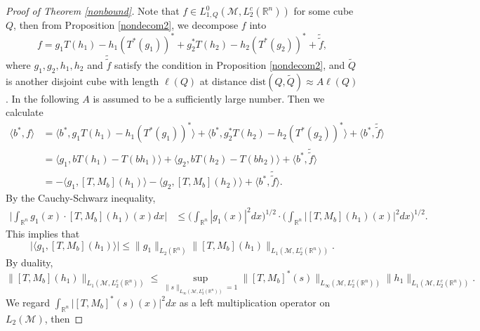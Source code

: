 \documentclass[oneside,english,a4wide]{amsart}
\numberwithin{equation}{section}
\numberwithin{figure}{section}
\theoremstyle{plain}
\theoremstyle{plain}
\theoremstyle{definition}
\theoremstyle{plain}
\theoremstyle{remark}
\theoremstyle{definition}
\theoremstyle{remark}
\theoremstyle{definition}
\newcommand{\8}{\infty}
\begin{document}
\begin{proof}[Proof of Theorem \ref{nonbound}]
	Note that $f\in L^0_{1,Q}(\mathcal{M},L_2^c(\mathbb{R}^n))$ for some cube $Q$, then from Proposition \ref{nondecom2}, we decompose $f$ into
	\begin{equation*}
		f=g_1T(h_1)-h_1(T^*(g_1))^*+ g_2^*T(h_2)-h_2(T^*(g_2))^*+\tilde{\tilde{f}},
	\end{equation*}
	where $g_1,g_2,h_1,h_2$ and $\tilde{\tilde{f}}$ satisfy the condition in Proposition \ref{nondecom2}, and $\tilde{Q}$ is another disjoint cube with length $\ell(Q)$ at distance $\mathrm{dist}(Q,\tilde{Q})\approx A\ell(Q)$. In the following $A$ is assumed to be a sufficiently large number. Then we calculate
	\begin{equation}\label{bf000}
		\begin{aligned}
			\langle b^*,f\rangle{}&=\big\langle b^*,g_1T(h_1)-h_1(T^*(g_1))^*\big\rangle+\big\langle b^*, g_2^*T(h_2)-h_2(T^*(g_2))^*\big\rangle+\langle b^*,\tilde{\tilde{f}}\rangle\\
			&=\big\langle g_1,bT(h_1)-T(bh_1)\big\rangle+\big\langle g_2,bT(h_2)-T(bh_2)\big\rangle+\langle b^*,\tilde{\tilde{f}}\rangle\\
			&=-\big\langle g_1,[T,M_b](h_1)\big\rangle-\big\langle g_2,[T,M_b](h_2)\big\rangle+\langle b^*,\tilde{\tilde{f}}\rangle.
		\end{aligned}
	\end{equation} 
	By the Cauchy-Schwarz inequality,
	\begin{equation*}
		\begin{aligned}
			\bigg|\int_{\mathbb{R}^n}  g_1(x)\cdot [T,M_b](h_1)(x)dx\bigg|{}&\le \bigg(\int_{\mathbb{R}^n}|g_1(x)|^2dx\bigg)^{1/2}\cdot \bigg(\int_{\mathbb{R}^n}\big|[T,M_b](h_1)(x)\big|^2dx\bigg)^{1/2}.
		\end{aligned}
	\end{equation*}
	This implies that
	\begin{equation}\label{g1tbh1666}
		\big|\big\langle g_1,[T,M_b](h_1)\big\rangle\big|\le \|g_1\|_{L_2(\mathbb{R}^n)}\|[T,M_b](h_1)\|_{L_1(\mathcal{M},L_2^c(\mathbb{R}^n))}.
	\end{equation}
	By duality,
	\begin{equation*}
		\|[T,M_b](h_1)\|_{L_1(\mathcal{M},L_2^c(\mathbb{R}^n))}\le\sup_{\|s\|_{L_\infty(\mathcal{M},L_2^c(\mathbb{R}^n))}= 1} \big\|[T,M_b]^*(s)\big\|_{L_\infty(\mathcal{M},L_2^c(\mathbb{R}^n))}\|h_1\|_{L_1(\mathcal{M},L_2^c(\mathbb{R}^n))}.
	\end{equation*}
    We regard $\int_{\mathbb{R}^n} \big|[T,M_b]^*(s)(x)\big|^2dx$ as a left multiplication operator on $L_2(\mathcal{M})$, then

\end{proof}
\end{document}

